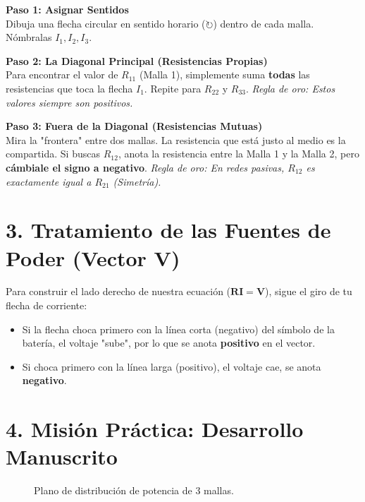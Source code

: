 \documentclass[11pt,a4paper]{article}
\begin{document}
\begin{tcolorbox}[colback=blue!5!white,colframe=UCBblue,title=\textbf{El Algoritmo Visual para Matrices}]
\textbf{Paso 1: Asignar Sentidos} \\
Dibuja una flecha circular en sentido horario ($\circlearrowright$) dentro de cada malla. Nómbralas $I_1, I_2, I_3$.

\vspace{0.2cm}
\textbf{Paso 2: La Diagonal Principal (Resistencias Propias)} \\
Para encontrar el valor de $R_{11}$ (Malla 1), simplemente suma \textbf{todas} las resistencias que toca la flecha $I_1$. Repite para $R_{22}$ y $R_{33}$. \textit{Regla de oro: Estos valores siempre son positivos.}

\vspace{0.2cm}
\textbf{Paso 3: Fuera de la Diagonal (Resistencias Mutuas)} \\
Mira la "frontera" entre dos mallas. La resistencia que está justo al medio es la compartida. Si buscas $R_{12}$, anota la resistencia entre la Malla 1 y la Malla 2, pero \textbf{cámbiale el signo a negativo}. \textit{Regla de oro: En redes pasivas, $R_{12}$ es exactamente igual a $R_{21}$ (Simetría).}
\end{tcolorbox}

\section*{3. Tratamiento de las Fuentes de Poder (Vector $\mathbf{V}$)}
Para construir el lado derecho de nuestra ecuación ($\mathbf{R}\mathbf{I} = \mathbf{V}$), sigue el giro de tu flecha de corriente:
\begin{itemize}
    \item Si la flecha choca primero con la línea corta (negativo) del símbolo de la batería, el voltaje "sube", por lo que se anota \textbf{positivo} en el vector.
    \item Si choca primero con la línea larga (positivo), el voltaje cae, se anota \textbf{negativo}.
\end{itemize}

\newpage

\section*{4. Misión Práctica: Desarrollo Manuscrito}

\begin{figure}[h!]
    \centering
    \caption{Plano de distribución de potencia de 3 mallas.}
\end{figure}
\end{document}
